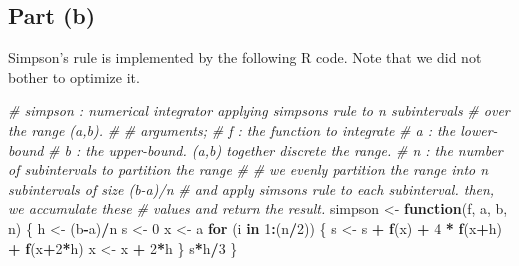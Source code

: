 \documentclass[
]{article}
\newenvironment{Shaded}{\begin{snugshade}}{\end{snugshade}}
\newcommand{\CommentTok}[1]{\textcolor[rgb]{0.56,0.35,0.01}{\textit{#1}}}
\newcommand{\ControlFlowTok}[1]{\textcolor[rgb]{0.13,0.29,0.53}{\textbf{#1}}}
\newcommand{\DecValTok}[1]{\textcolor[rgb]{0.00,0.00,0.81}{#1}}
\newcommand{\FunctionTok}[1]{\textcolor[rgb]{0.13,0.29,0.53}{\textbf{#1}}}
\newcommand{\NormalTok}[1]{#1}
\newcommand{\OtherTok}[1]{\textcolor[rgb]{0.56,0.35,0.01}{#1}}
\newcommand{\SpecialCharTok}[1]{\textcolor[rgb]{0.81,0.36,0.00}{\textbf{#1}}}
\begin{document}
\hypertarget{part-b-2}{%
\subsection{Part (b)}\label{part-b-2}}


Simpson's rule is implemented by the following R code. Note that we did
not bother to optimize it.

\begin{Shaded}
\begin{Highlighting}[]
\CommentTok{\# simpson : numerical integrator applying simpson\textquotesingle{}s rule to n subintervals}
\CommentTok{\# over the range (a,b).}
\CommentTok{\#}
\CommentTok{\# arguments;}
\CommentTok{\#   f : the function to integrate}
\CommentTok{\#   a : the lower{-}bound}
\CommentTok{\#   b : the upper{-}bound. (a,b) together discrete the range.}
\CommentTok{\#   n : the number of subintervals to partition the range}
\CommentTok{\#}
\CommentTok{\# we evenly partition the range into n subintervals of size (b{-}a)/n}
\CommentTok{\# and apply simson\textquotesingle{}s rule to each subinterval. then, we accumulate these}
\CommentTok{\# values and return the result.}
\NormalTok{simpson }\OtherTok{\textless{}{-}} \ControlFlowTok{function}\NormalTok{(f, a, b, n)}
\NormalTok{  \{}
\NormalTok{    h }\OtherTok{\textless{}{-}}\NormalTok{ (b}\SpecialCharTok{{-}}\NormalTok{a)}\SpecialCharTok{/}\NormalTok{n}
\NormalTok{    s }\OtherTok{\textless{}{-}} \DecValTok{0}
\NormalTok{    x }\OtherTok{\textless{}{-}}\NormalTok{ a}
    \ControlFlowTok{for}\NormalTok{ (i }\ControlFlowTok{in} \DecValTok{1}\SpecialCharTok{:}\NormalTok{(n}\SpecialCharTok{/}\DecValTok{2}\NormalTok{))}
\NormalTok{    \{}
\NormalTok{      s }\OtherTok{\textless{}{-}}\NormalTok{ s }\SpecialCharTok{+} \FunctionTok{f}\NormalTok{(x) }\SpecialCharTok{+} \DecValTok{4} \SpecialCharTok{*} \FunctionTok{f}\NormalTok{(x}\SpecialCharTok{+}\NormalTok{h) }\SpecialCharTok{+} \FunctionTok{f}\NormalTok{(x}\SpecialCharTok{+}\DecValTok{2}\SpecialCharTok{*}\NormalTok{h)}
\NormalTok{      x }\OtherTok{\textless{}{-}}\NormalTok{ x }\SpecialCharTok{+} \DecValTok{2}\SpecialCharTok{*}\NormalTok{h}
\NormalTok{    \}}
\NormalTok{    s}\SpecialCharTok{*}\NormalTok{h}\SpecialCharTok{/}\DecValTok{3}
\NormalTok{\}}
\end{Highlighting}
\end{Shaded}
\end{document}
